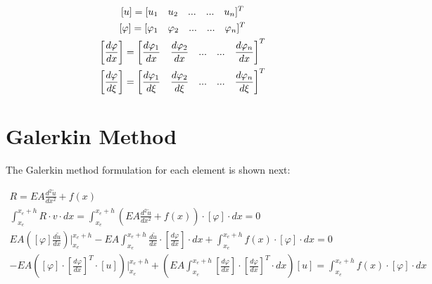 \documentclass{article}
\begin{document}
\begin{equation}\label{eq:vectors}
    \begin{gathered}
        \relax[u]=[u_1 \quad u_2 \quad ... \quad ... \quad u_n]^T\\
        \relax[\varphi]=[\varphi_1 \quad \varphi_2 \quad ... \quad ... \quad \varphi_n]^T\\
        \relax\left[\frac{d\varphi}{dx}\right]=\left[\frac{d\varphi_1}{dx} \quad \frac{d\varphi_2}{dx} \quad ... \quad ... \quad \frac{d\varphi_n}{dx}\right]^T\\
        \relax\left[\frac{d\varphi}{d\xi}\right]=\left[\frac{d\varphi_1}{d\xi} \quad \frac{d\varphi_2}{d\xi} \quad ... \quad ... \quad \frac{d\varphi_n}{d\xi}\right]^T\\
    \end{gathered}
\end{equation}

\vspace{2ex}

\section{Galerkin Method}

The Galerkin method formulation for each element is shown next: 

\vspace{2ex}

\begin{equation}\label{eq:GM_Formulation}
    \begin{gathered}
        R=EA\frac{d^2\tilde{u}}{dx^2}+f(x)\\
        \int_{x_e}^{x_e+h}{R\cdot v \cdot dx}=\int_{x_e}^{x_e+h}{\left(EA\frac{d^2\tilde{u}}{dx^2}+f(x) \right)\cdot[\varphi]\cdot dx}=0\\
        EA\left([\varphi]\frac{d\tilde{u}}{dx}\right)\Bigg\rvert_{x_e}^{x_e+h}-EA\int_{x_e}^{x_e+h}{\frac{d\tilde{u}}{dx}\cdot \left[\frac{d\varphi}{dx}\right] \cdot dx}+\int_{x_e}^{x_e+h}{f(x) \cdot[\varphi]\cdot dx}=0\\
        -EA\left([\varphi]\cdot\left[\frac{d\varphi}{dx}\right]^T\cdot [u]\right)\Bigg\rvert_{x_e}^{x_e+h}+\left(EA\int_{x_e}^{x_e+h}{ \left[\frac{d\varphi}{dx}\right] \cdot \left[\frac{d\varphi}{dx}\right]^T\cdot dx}\right) [u]=\int_{x_e}^{x_e+h}{f(x) \cdot[\varphi]\cdot dx} 
    \end{gathered}
\end{equation}

\vspace{2ex}
\end{document}
